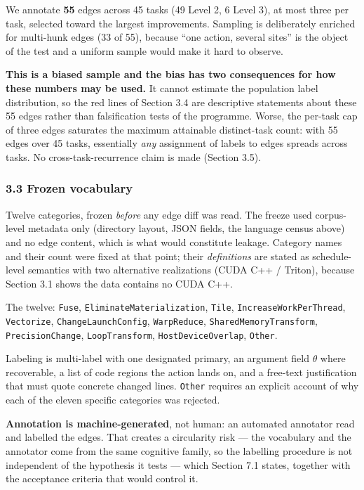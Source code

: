 \documentclass[
  11pt,
]{article}
\begin{document}
We annotate \textbf{55} edges across 45 tasks (49 Level 2, 6 Level 3), at most three per task, selected toward the largest improvements. Sampling is deliberately enriched for multi-hunk edges (33 of 55), because ``one action, several sites'' is the object of the test and a uniform sample would make it hard to observe.

\textbf{This is a biased sample and the bias has two consequences for how these numbers may be used.} It cannot estimate the population label distribution, so the red lines of Section 3.4 are descriptive statements about these 55 edges rather than falsification tests of the programme. Worse, the per-task cap of three edges saturates the maximum attainable distinct-task count: with 55 edges over 45 tasks, essentially \emph{any} assignment of labels to edges spreads across tasks. No cross-task-recurrence claim is made (Section 3.5).

\hypertarget{frozen-vocabulary}{%
\subsubsection{3.3 Frozen vocabulary}\label{frozen-vocabulary}}

Twelve categories, frozen \emph{before} any edge diff was read. The freeze used corpus-level metadata only (directory layout, JSON fields, the language census above) and no edge content, which is what would constitute leakage. Category names and their count were fixed at that point; their \emph{definitions} are stated as schedule-level semantics with two alternative realizations (CUDA C++ / Triton), because Section 3.1 shows the data contains no CUDA C++.

The twelve: \texttt{Fuse}, \texttt{EliminateMaterialization}, \texttt{Tile}, \texttt{IncreaseWorkPerThread}, \texttt{Vectorize}, \texttt{ChangeLaunchConfig}, \texttt{WarpReduce}, \texttt{SharedMemoryTransform}, \texttt{PrecisionChange}, \texttt{LoopTransform}, \texttt{HostDeviceOverlap}, \texttt{Other}.

Labeling is multi-label with one designated primary, an argument field \(\theta\) where recoverable, a list of code regions the action lands on, and a free-text justification that must quote concrete changed lines. \texttt{Other} requires an explicit account of why each of the eleven specific categories was rejected.

\textbf{Annotation is machine-generated}, not human: an automated annotator read and labelled the edges. That creates a circularity risk --- the vocabulary and the annotator come from the same cognitive family, so the labelling procedure is not independent of the hypothesis it tests --- which Section 7.1 states, together with the acceptance criteria that would control it.
\end{document}
